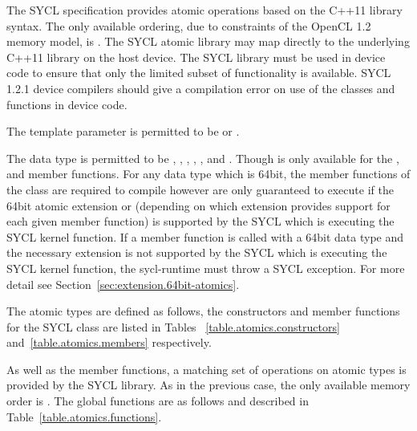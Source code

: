 The SYCL specification provides atomic operations based on the C++11
library syntax. The only available ordering, due to constraints of the
OpenCL 1.2 memory model, is .
The SYCL atomic library may map directly to
the underlying C++11 library on the host device. The SYCL
library must be used in device code to ensure that only the limited
subset of functionality is available. SYCL 1.2.1 device compilers should
give a compilation error on use of the 
classes and functions in device code.

The template parameter  is permitted to be
 or .

The data type  is permitted to be , , , , ,  and . Though
 is only available for the ,  and  member functions. For any data type
 which is 64bit, the member functions of the 
class are required to compile however are only guaranteed to execute if the
64bit atomic extension  or  (depending on which extension provides support
for each given member function) is supported by the SYCL 
which is executing the SYCL kernel function. If a member function is called with
a 64bit data type and the necessary extension is not supported by the SYCL
 which is executing the SYCL kernel function, the
\gls{sycl-runtime} must throw a SYCL 
exception. For more detail see Section~\ref{sec:extension.64bit-atomics}.

The atomic types are defined as follows, the constructors and member functions
for the SYCL  class are listed in Tables~
\ref{table.atomics.constructors} and~\ref{table.atomics.members} respectively.


As well as the member functions, a matching set of operations on atomic types
is provided by the SYCL library. As in the previous case, the only available
memory order is . The global functions are as
follows and described in Table~\ref{table.atomics.functions}.

